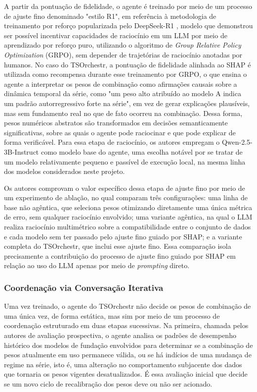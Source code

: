 A partir da pontuação de fidelidade, o agente é treinado por meio de um processo de ajuste fino denominado "estilo R1", em referência à metodologia de treinamento por reforço popularizada pelo DeepSeek-R1 \citep{guo2025deepseekr1}, modelo que demonstrou ser possível incentivar capacidades de raciocínio em um LLM por meio de aprendizado por reforço puro, utilizando o algoritmo de \textit{Group Relative Policy Optimization} (GRPO), sem depender de trajetórias de raciocínio anotadas por humanos. No caso do TSOrchestr, a pontuação de fidelidade alinhada ao SHAP é utilizada como recompensa durante esse treinamento por GRPO, o que ensina o agente a interpretar os pesos de combinação como afirmações causais sobre a dinâmica temporal da série, como "um peso alto atribuído ao modelo A indica um padrão autorregressivo forte na série", em vez de gerar explicações plausíveis, mas sem fundamento real no que de fato ocorreu na combinação. Dessa forma, pesos numéricos abstratos são transformados em decisões semanticamente significativas, sobre as quais o agente pode raciocinar e que pode explicar de forma verificável. Para essa etapa de raciocínio, os autores empregam o Qwen-2.5-3B-Instruct como modelo base do agente, uma escolha notável por se tratar de um modelo relativamente pequeno e passível de execução local, na mesma linha dos modelos considerados neste projeto.

Os autores comprovam o valor específico dessa etapa de ajuste fino por meio de um experimento de ablação, no qual comparam três configurações: uma linha de base não agêntica, que seleciona pesos otimizando diretamente uma única métrica de erro, sem qualquer raciocínio envolvido; uma variante agêntica, na qual o LLM realiza raciocínio multimétrico sobre a compatibilidade entre o conjunto de dados e cada modelo sem ter passado pelo ajuste fino guiado por SHAP; e a variante completa do TSOrchestr, que inclui esse ajuste fino. Essa comparação isola precisamente a contribuição do processo de ajuste fino guiado por SHAP em relação ao uso do LLM apenas por meio de \textit{prompting} direto.

\subsubsection{Coordenação via Conversação Iterativa}

Uma vez treinado, o agente do TSOrchestr não decide os pesos de combinação de uma única vez, de forma estática, mas sim por meio de um processo de coordenação estruturado em duas etapas sucessivas. Na primeira, chamada pelos autores de avaliação prospectiva, o agente analisa os padrões de desempenho histórico dos modelos de fundação envolvidos para determinar se a combinação de pesos atualmente em uso permanece válida, ou se há indícios de uma mudança de regime na série, isto é, uma alteração no comportamento subjacente dos dados que tornaria os pesos vigentes desatualizados. É essa avaliação inicial que decide se um novo ciclo de recalibração dos pesos deve ou não ser acionado.


